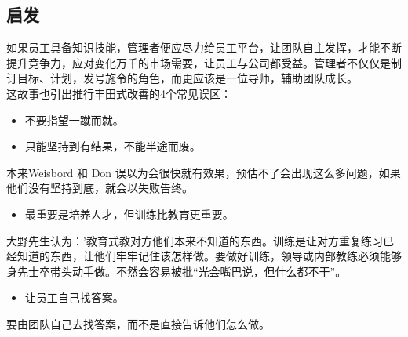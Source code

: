 \hypertarget{weisbord-ux6545ux4e8bux7684ux542fux53d1}{%
\subsection{启发}\label{weisbord-ux6545ux4e8bux7684ux542fux53d1}}

如果员工具备知识技能，管理者便应尽力给员工平台，让团队自主发挥，才能不断提升竞争力，应对变化万千的市场需要，让员工与公司都受益。管理者不仅仅是制订目标、计划，发号施令的角色，而更应该是一位导师，辅助团队成长。\\

这故事也引出推行丰田式改善的4个常见误区：

\begin{itemize}
\tightlist
\item
  不要指望一蹴而就。
\item
  只能坚持到有结果，不能半途而废。
\end{itemize}

\begin{description}
\tightlist
\item[]
本来Weisbord 和 Don
误以为会很快就有效果，预估不了会出现这么多问题，如果他们没有坚持到底，就会以失败告终。
\end{description}

\begin{itemize}
\tightlist
\item
  最重要是培养人才，但训练比教育更重要。
\end{itemize}

\begin{description}
\tightlist
\item[]
大野先生认为：'教育式教对方他们本来不知道的东西。训练是让对方重复练习已经知道的东西，让他们牢牢记住该怎样做。要做好训练，领导或内部教练必须能够身先士卒带头动手做。不然会容易被批``光会嘴巴说，但什么都不干''。
\end{description}

\begin{itemize}
\tightlist
\item
  让员工自己找答案。
\end{itemize}

\begin{description}
\tightlist
\item[]
要由团队自己去找答案，而不是直接告诉他们怎么做。
\end{description}

